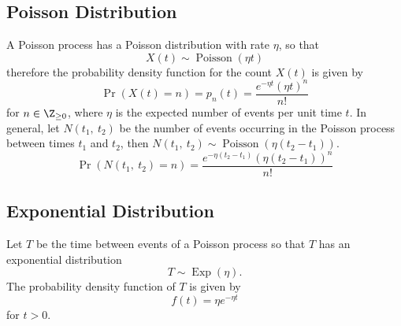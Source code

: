 \documentclass{article}
\begin{document}
\subsection{Poisson Distribution}
A Poisson process has a Poisson distribution with rate \(\eta\), so
that
\begin{equation*}
    X\left( t \right) \sim \operatorname{Poisson}{\left( \eta t \right)}
\end{equation*}
therefore the probability density function for the count \(X\left( t \right)\) is given by
\begin{equation*}
    \Pr{\left( X\left( t \right) = n \right)} = p_n\left( t \right) = \frac{e^{-\eta t} \left( \eta t \right)^n}{n!}
\end{equation*}
for \(n \in \Z_{\geq 0}\), where \(\eta\) is the expected number of events per unit time \(t\).
In general, let \(N\left( t_1,\: t_2 \right)\) be the number of events
occurring in the Poisson process between times \(t_1\) and \(t_2\),
then \(N\left( t_1,\: t_2 \right) \sim \operatorname{Poisson}{\left(
    \eta \left( t_2 - t_1 \right) \right)}\).
\begin{equation*}
    \Pr\left( N\left( t_1,\: t_2 \right) = n \right) = \frac{e^{-\eta \left( t_2 - t_1 \right)} \left( \eta \left( t_2 - t_1 \right) \right)^n}{n!}
\end{equation*}
\subsection{Exponential Distribution}
Let \(T\) be the time between events of a Poisson process so that \(T\)
has an exponential distribution
\begin{equation*}
    T \sim \operatorname{Exp}{\left( \eta \right)}.
\end{equation*}
The probability density function of \(T\) is given by
\begin{equation*}
    f\left( t \right) = \eta e^{-\eta t}
\end{equation*}
for \(t > 0\).
\end{document}
